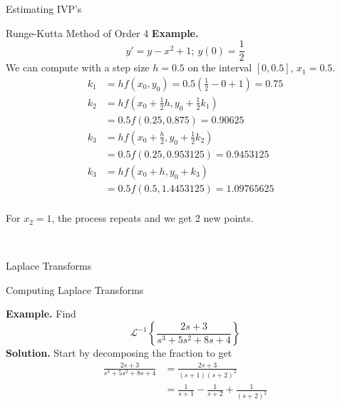 \documentclass{article}
\newcommand{\ilaplace}[1]{\mathcal{L}^{-1}\left\{#1\right\}}
\begin{document}
\begin{multicols*}{3}
\begin{blackbox}{Estimating IVP's}
\begin{redbox}{Runge-Kutta Method of Order 4}
            \textbf{Example.} \\[-5ex]
            \[y' = y - x^2 + 1; \ y(0) = \frac{1}{2}\]            
            We can compute with a step size $h = 0.5$ on the interval $[0,0.5]$, $x_1 = 0.5$.
            \vspace{-2ex}
            {\footnotesize
            \begin{align*}
                k_1 &= hf(x_0, y_0) = 0.5\left(\frac{1}{2} - 0 + 1\right) = 0.75\\
                k_2 &= hf\left(x_0 + \frac{1}{2}h, y_0 + \frac{1}{2}k_1\right)\\
                &= 0.5f(0.25,0.875) = 0.90625\\
                k_3 &= hf\left(x_0 + \frac{h}{2}, y_0 + \frac{1}{2}k_2\right)\\
                &= 0.5f(0.25, 0.953125) = 0.9453125\\
                k_3 &= hf\left(x_0 + h, y_0 + k_3\right)\\
                &= 0.5f(0.5, 1.4453125) = 1.09765625\\
            \end{align*}
            \vspace{-8ex}
            }

            For $x_2 = 1$, the process repeats and we get 2 new points. 
            \end{redbox}\\[-2ex]
        \end{blackbox}
        \begin{blackbox}{Laplace Transforms}
            \begin{bluebox}{Computing Laplace Transforms}
                {\footnotesize
                \textbf{Example.} Find \\[-4ex]
                \[\ilaplace{\frac{2s+3}{s^3 + 5s^2 + 8s + 4}}\]
                \textbf{Solution.} Start by decomposing the fraction to get \\[-2ex]
                \begin{align*}
                    \frac{2s+3}{s^3+5s^2+8s + 4} &= \frac{2s+3}{(s+1)(s+2)^2}\\
                    &=\frac{1}{s+1} - \frac{1}{s+2}  + \frac{1}{(s+2)^2}
                \end{align*}
                \vspace{-4ex}

}
\end{bluebox}
\end{blackbox}
\end{multicols*}
\end{document}
